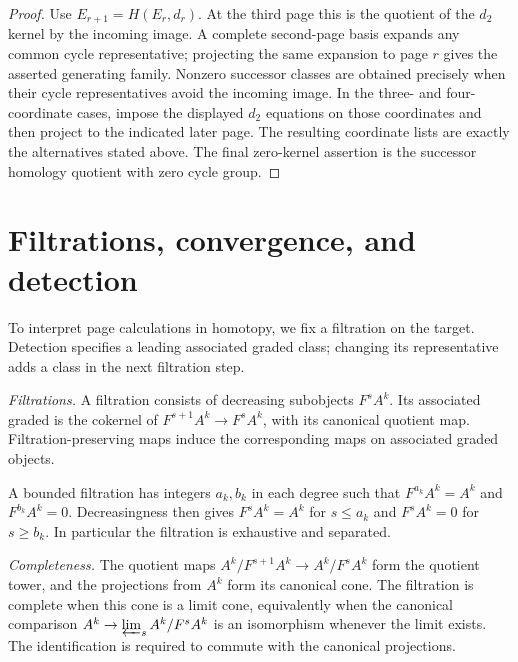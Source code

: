 \begin{proof}
Use $E_{r+1}=H(E_r,d_r)$. At the third page this is the quotient of the
$d_2$ kernel by the incoming image. A complete second-page basis expands
any common cycle representative; projecting the same expansion to page
$r$ gives the asserted generating family. Nonzero successor classes are
obtained precisely when their cycle representatives avoid the incoming
image. In the three- and four-coordinate cases, impose the displayed
$d_2$ equations on those coordinates and then project to the indicated
later page. The resulting coordinate lists are exactly the alternatives
stated above. The final zero-kernel assertion is the successor homology
quotient with zero cycle group.
\end{proof}


\section{Filtrations, convergence, and detection}

To interpret page calculations in homotopy, we fix a filtration on the
target. Detection specifies a leading associated graded class; changing
its representative adds a class in the next filtration step.

\begin{definition}
\label{sem:SpectralSequence:filtration}
\label{sem:SpectralSequence:completion}
\textit{Filtrations.} A filtration consists of decreasing subobjects $F^s A^k$. Its associated graded is the cokernel of $F^{s+1}A^k\longrightarrow F^sA^k$, with its canonical quotient map. Filtration-preserving maps induce the corresponding maps on associated graded objects.

A bounded filtration has integers $a_k,b_k$ in each degree such that
$F^{a_k}A^k=A^k$ and $F^{b_k}A^k=0$. Decreasingness then gives
$F^sA^k=A^k$ for $s\le a_k$ and $F^sA^k=0$ for $s\ge b_k$.
In particular the filtration is exhaustive and separated.

\textit{Completeness.} The quotient maps $A^k/F^{s+1}A^k\to A^k/F^sA^k$ form the quotient
tower, and the projections from $A^k$ form its canonical cone. The
filtration is complete when this cone is a limit cone, equivalently
when the canonical comparison
$A^k\to\varprojlim_s A^k/F^sA^k$ is an isomorphism whenever the limit
exists. The identification is required to commute with the canonical projections.
\end{definition}


